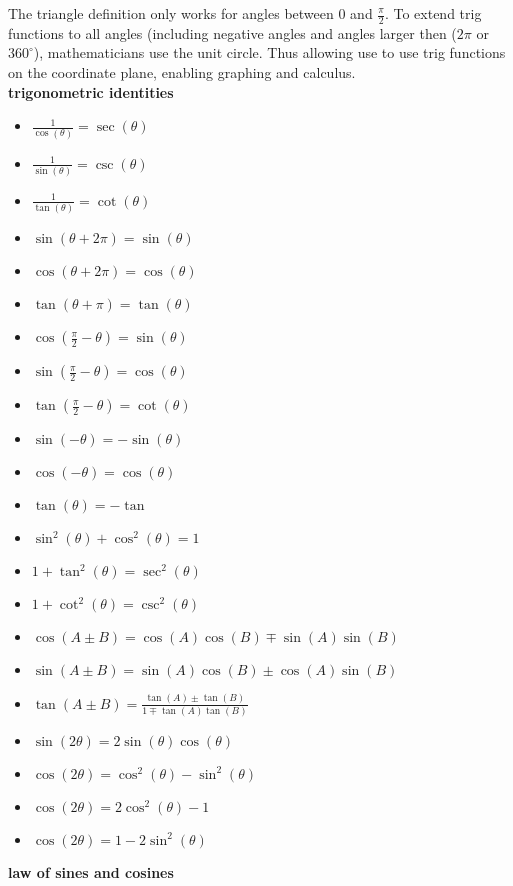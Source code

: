 \documentclass{article}
\begin{document}
The triangle definition only works for angles between 0 and $\frac{\pi}{2}$. To extend trig functions to all angles (including negative angles and angles larger then ($2\pi$ or $360^{\circ}$), mathematicians use the unit circle. Thus allowing use to use trig functions on the coordinate plane, enabling graphing and calculus.\\	

\textbf{trigonometric identities}
\begin{itemize}
	\item $\frac{1}{\cos(\theta)} = \sec(\theta)$	
	\item $\frac{1}{\sin(\theta)} = \csc(\theta) $
	\item $\frac{1}{\tan(\theta)} = \cot(\theta)$
	\item $\sin(\theta + 2\pi) = \sin(\theta)$
	\item $\cos(\theta + 2\pi) = \cos(\theta)$
	\item $\tan(\theta + \pi) = \tan(\theta)$
	\item $\cos(\frac{\pi}{2} - \theta) = \sin(\theta)$
	\item $\sin(\frac{\pi}{2} - \theta) = \cos(\theta)$
	\item $\tan(\frac{\pi}{2} - \theta) = \cot(\theta)$
	\item $\sin(-\theta) = -\sin(\theta)$
	\item $\cos(-\theta) = \cos(\theta)$
	\item $\tan(\theta) = -\tan$
	\item $\sin^2(\theta) + \cos^2(\theta) = 1$
	\item $1 + \tan^2(\theta) = \sec^2(\theta)$
	\item $1 + \cot^2(\theta) = \csc^2(\theta)$
	\item $\cos(A \pm B) = \cos(A)\cos(B) \mp \sin(A)\sin(B)$		
	\item $\sin(A \pm B) = \sin(A)\cos(B) \pm \cos(A)\sin(B)$
	\item $\tan(A \pm B) = \frac{\tan(A) \pm \tan(B)}{1 \mp \tan(A)\tan(B)}$
	\item $\sin(2\theta) = 2\sin(\theta)\cos(\theta)$
	\item $\cos(2\theta) = \cos^2(\theta) - \sin^2(\theta)$		
	\item $\cos(2\theta) = 2\cos^2(\theta) - 1$
	\item $\cos(2\theta) = 1 - 2\sin^2(\theta)$
\end{itemize}

\textbf{law of sines and cosines}\\
\end{document}
